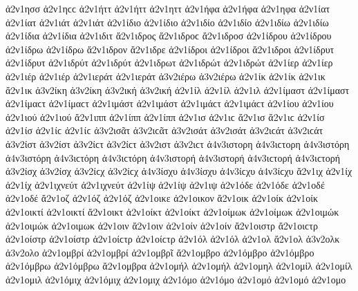 {ἀ2ν1ησσ ἀ2ν1ηϲϲ 
ἀ2ν1ήττ ἀ2ν1ήττ   %
ἀ2ν1ηττ 
ἀ2ν1ήφα ἀ2ν1ήφα   %
ἀ2ν1ηφα 
ἀ2ν1ίατ ἀ2ν1ίατ   %
ἀ2ν1ιάτ ἀ2ν1ιάτ 
ἀ2ν1ίδιο ἀ2ν1ίδιο   %
ἀ2ν1ιδίο ἀ2ν1ιδίο 
ἀ2ν1ιδίω ἀ2ν1ιδίω 
ἀ2ν1ίδια ἀ2ν1ίδια 
ἀ2ν1ιδιτ   %
ἄ2ν1ιδρος ἄ2ν1ιδροϲ   %
ἄ2ν1ιδροσ 
ἀ2ν1ίδρου ἀ2ν1ίδρου 
ἀ2ν1ίδρω ἀ2ν1ίδρω 
ἄ2ν1ιδρον 
ἄ2ν1ιδρε 
ἀ2ν1ίδροι ἀ2ν1ίδροι 
ἄ2ν1ιδροι 
ἀ2ν1ίδρυτ ἀ2ν1ίδρυτ   %
ἀ2ν1ιδρύτ ἀ2ν1ιδρύτ 
ἀ2ν1ιδρωτ   %
ἀ2ν1ιδρώτ ἀ2ν1ιδρώτ   %
ἀ2ν1ίερ ἀ2ν1ίερ   %
ἀ2ν1ιέρ ἀ2ν1ιέρ 
ἀ2ν1ιεράτ ἀ2ν1ιεράτ   %
ἀ3ν2ιέρω ἀ3ν2ιέρω   %
ἀ2ν1ίκ ἀ2ν1ίκ   %
ἀ2ν1ικ 
ἄ2ν1ικ   %
ἀ3ν2ίκη ἀ3ν2ίκη   %
ἀ3ν2ική ἀ3ν2ική 
ἀ2ν1ίλ ἀ2ν1ίλ   %
ἀ2ν1ιλ 
ἀ2ν1ίμαστ ἀ2ν1ίμαστ ἀ2ν1ίμαϲτ ἀ2ν1ίμαϲτ   %
ἀ2ν1ιμάστ ἀ2ν1ιμάστ ἀ2ν1ιμάϲτ ἀ2ν1ιμάϲτ 
ἀ2ν1ίου ἀ2ν1ίου   %
ἀ2ν1ιού ἀ2ν1ιού 
ἄ2ν1ιππ   %
ἀ2ν1ίππ ἀ2ν1ίππ 
ἀ2ν1ισ ἀ2ν1ιϲ   %
ἄ2ν1ισ ἄ2ν1ιϲ   %
ἀ2ν1ίσ ἀ2ν1ίσ ἀ2ν1ίϲ ἀ2ν1ίϲ 
ἀ3ν2ισᾶτ ἀ3ν2ιϲᾶτ   %
ἀ3ν2ισάτ ἀ3ν2ισάτ ἀ3ν2ιϲάτ ἀ3ν2ιϲάτ 
ἀ3ν2ίστ ἀ3ν2ίστ ἀ3ν2ίϲτ ἀ3ν2ίϲτ   %
ἀ3ν2ιστ ἀ3ν2ιϲτ 
ἀ4ν3ιστορη ἀ4ν3ιϲτορη   %
ἀ4ν3ιστόρη ἀ4ν3ιστόρη ἀ4ν3ιϲτόρη ἀ4ν3ιϲτόρη   %
ἀ4ν3ιστορή ἀ4ν3ιστορή ἀ4ν3ιϲτορή ἀ4ν3ιϲτορή 
ἀ3ν2ίσχ ἀ3ν2ίσχ ἀ3ν2ίϲχ ἀ3ν2ίϲχ   %
ἀ4ν3ίσχυ ἀ4ν3ίσχυ ἀ4ν3ίϲχυ ἀ4ν3ίϲχυ   %
ἄ2ν1ιχ   %
ἀ2ν1ίχ ἀ2ν1ίχ 
ἀ2ν1ιχνεύτ ἀ2ν1ιχνεύτ   %
ἀ2ν1ίψ ἀ2ν1ίψ   %
ἀ2ν1ιψ 
ἀ2ν1όδε ἀ2ν1όδε   %
ἀ2ν1οδέ ἀ2ν1οδέ 
ἄ2ν1οζ   %
ἀ2ν1όζ ἀ2ν1όζ 
ἀ2ν1οικε   %
ἀ2ν1οικον   %
ἄ2ν1οικ   %
ἀ2ν1οίκ ἀ2ν1οίκ 
ἀ2ν1οικτί ἀ2ν1οικτί   %
ἄ2ν1οικτ   %
ἀ2ν1οίκτ ἀ2ν1οίκτ 
ἀ2ν1οίμωκ ἀ2ν1οίμωκ   %
ἀ2ν1οιμώκ ἀ2ν1οιμώκ 
ἀ2ν1οιμωκ   %
ἀ2ν1οιν   %
ἄ2ν1οιν   %
ἀ2ν1οίν ἀ2ν1οίν 
ἄ2ν1οιστρ ἄ2ν1οιϲτρ   %
ἀ2ν1οίστρ ἀ2ν1οίστρ ἀ2ν1οίϲτρ ἀ2ν1οίϲτρ 
ἀ2ν1όλ ἀ2ν1όλ   %
ἀ2ν1ολ 
ἄ2ν1ολ   %
ἀ3ν2ολκ   %
ἀ3ν2ολο   %
ἀ2ν1ομβρί ἀ2ν1ομβρί   %
ἀ2ν1ομβρῖ 
ἄ2ν1ομβρο   %
ἀ2ν1όμβρο ἀ2ν1όμβρο 
ἀ2ν1όμβρω ἀ2ν1όμβρω 
ἄ2ν1ομβρα 
ἀ2ν1ομήλ ἀ2ν1ομήλ   %
ἀ2ν1ομηλ 
ἀ2ν1ομίλ ἀ2ν1ομίλ   %
ἀ2ν1ομιλ 
ἀ2ν1όμιχ ἀ2ν1όμιχ   %
ἀ2ν1ομιχ 
ἀ2ν1όμο ἀ2ν1όμο   %
ἀ2ν1ομό ἀ2ν1ομό 
ἀ2ν1ομο   %
}
